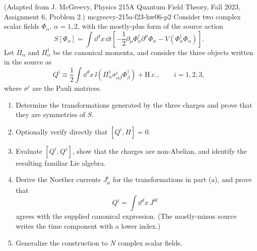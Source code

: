 \begin{enumerate}
  {(Adapted from J. McGreevy, Physics 215A Quantum Field Theory, Fall 2023, Assignment 6, Problem 2.)}
  {mcgreevy-215a-f23-hw06-p2}
Consider two complex scalar fields
\(\Phi_{\alpha}\), \(\alpha=1,2\), with the mostly-plus form of the
source action
\[
 S[\Phi_\alpha]=\int \dd^dx\,\dd t\left[
 -\frac12\partial_\mu\Phi_\alpha^\dagger
             \partial^\mu\Phi_\alpha
 -V(\Phi_\alpha^\dagger\Phi_\alpha)\right].
\]
Let \(\Pi_\alpha\) and \(\Pi_\alpha^\dagger\) be the canonical momenta,
and consider the three objects written in the source as
\[
 Q^i\equiv\frac12\int \dd^dx\,
 \ii\left(\Pi_\alpha^\dagger
 \sigma^i_{\alpha\beta}\Phi_\beta^\dagger\right)
 +\mathrm{H.c.},
\qquad i=1,2,3,
\]
where \(\sigma^i\) are the Pauli matrices.
\begin{enumerate}
\item
Determine the transformations generated by the three charges and prove
that they are symmetries of \(S\).
\item
Optionally verify directly that \([Q^i,H]=0\).
\item
Evaluate \([Q^i,Q^j]\), show that the charges are non-Abelian, and
identify the resulting familiar Lie algebra.
\item
Derive the Noether currents \(J_\mu^i\) for the transformations in
part (a), and prove that
\[
 Q^i=\int \dd^dx\,J^{0\ii}
\]
agrees with the supplied canonical expression.  (The mostly-minus
source writes the time component with a lower index.)
\item
Generalize the construction to \(N\) complex scalar fields.
\end{enumerate}


\end{enumerate}
